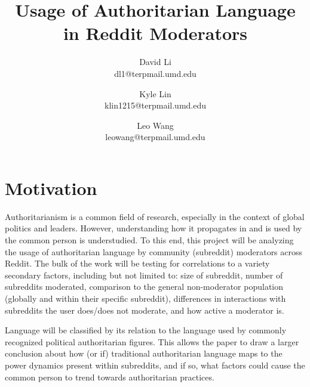\documentclass[letterpaper,twocolumn,10pt]{article}
\begin{document}

\date{}

\title{\Large \bf Usage of Authoritarian Language in Reddit Moderators}

\author{ %
{\rm David Li}\\
dl1@terpmail.umd.edu
\and
{\rm Kyle Lin}\\
klin1215@terpmail.umd.edu
\and
{\rm Leo Wang}\\
leowang@terpmail.umd.edu
}

\maketitle

\section{Motivation}


Authoritarianism is a common field of research, especially in the context of global politics and leaders. However, understanding how it propagates in and is used by the common person is understudied. To this end, this project will be analyzing the usage of authoritarian language by community (subreddit) moderators across Reddit. The bulk of the work will be testing for correlations to a variety secondary factors, including but not limited to: size of subreddit, number of subreddits moderated, comparison to the general non-moderator population (globally and within their specific subreddit), differences in interactions with subreddits the user does/does not moderate, and how active a moderator is.

Language will be classified by its relation to the language used by commonly recognized political authoritarian figures. This allows the paper to draw a larger conclusion about how (or if) traditional authoritarian language maps to the power dynamics present within subreddits, and if so, what factors could cause the common person to trend towards authoritarian practices.
\end{document}
